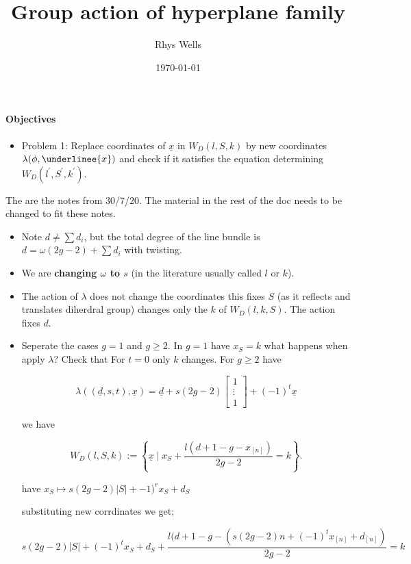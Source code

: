 \documentclass[a4paper,12pt]{article}
\title{Group action of hyperplane family}
\author{Rhys Wells}
\date{\today}
\theoremstyle{definition}
\theoremstyle{indented}
\newenvironment{titlemize}[1]{%
  \paragraph{#1}
  \begin{itemize}}
  {\end{itemize}}
\begin{document}
\maketitle

\begin{titlemize}{Objectives}

\item Problem 1: Replace coordinates of $\underline{x}$ in $W_D(l,S,k)$ by new coordinates $\lambda(\phi,\underlinee{x})$ and check if it satisfies the equation determining $W_D(l^{'},S^{'},k^{'})$.

 
\end{titlemize}

\hline
The are the notes from 30/7/20. The material in the rest of the doc needs to be changed to fit these notes.

\begin{itemize}
    \item Note $d \ne \sum d_i$, but the total degree of the line bundle is $d= \omega (2g-2) + \sum d_i$ with twisting.

\item We are \textbf{changing $\omega$ to $s$} (in the literature usually called $l$ or $k$).

\item The action of $\lambda$ does not change the coordinates this fixes $S$ (as it reflects and translates diherdral group) changes only the $k$ of $W_D(l,k,S)$. The action fixes $d$.

\item Seperate the cases $g=1$ and $g \ge 2$. In $g=1$ have $x_S=k$ what happens when apply $\lambda$? Check that For $t=0$ only $k$ changes. For $g\ge 2$ have 

$$ \lambda((\underline{d},s,t), \underline{x})= \underline{d} +s(2g-2)  \begin{bmatrix}
           1 \\
           \vdots \\
           1
         \end{bmatrix}
 +(-1)^t \underline{x}$$


we have 

$$W_D(l,S,k):= \left\{ \underline{x} \mid x_S + \frac{ l(d+1-g - x_{[n] } ) } {2g-2} = k \right\}. $$

have $x_{S} \mapsto s(2g-2)|S| + -1)^r x_{S} + d_S$

substituting new corrdinates we get;

$$s(2g-2)|S| + (-1)^t x_{S} + d_{S} +\frac{ l(d+1-g -(s(2g-2) n +(-1)^t x_{[n]} + d_{[n]} ) } {2g-2} = k$$ 


\end{itemize}
\end{document}
